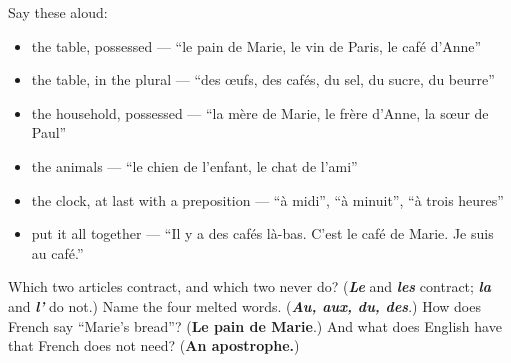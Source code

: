 Say these aloud:

\begin{itemize}
\raggedright
  \item the table, possessed — \textquotedblleft{}le pain de Marie, le vin de Paris, le café d'Anne\textquotedblright{}
  \item the table, in the plural — \textquotedblleft{}des œufs, des cafés, du sel, du sucre, du beurre\textquotedblright{}
  \item the household, possessed — \textquotedblleft{}la mère de Marie, le frère d'Anne, la sœur de Paul\textquotedblright{}
  \item the animals — \textquotedblleft{}le chien de l'enfant, le chat de l'ami\textquotedblright{}
  \item the clock, at last with a preposition — \textquotedblleft{}à midi\textquotedblright{}, \textquotedblleft{}à minuit\textquotedblright{}, \textquotedblleft{}à trois heures\textquotedblright{}
  \item put it all together — \textquotedblleft{}Il y a des cafés là-bas. C'est le café de Marie. Je suis au café.\textquotedblright{}
\end{itemize}

\begin{tcolorbox}[breakable,colback=teal!4,colframe=teal!35!black,title={Before you move on}]
Which two articles contract, and which two never do? (\emph{\textbf{Le}} and \emph{\textbf{les}} contract; \emph{\textbf{la}} and \emph{\textbf{l'}} do not.) Name the four melted words. (\emph{\textbf{Au, aux, du, des}}.) How does French say \textquotedblleft{}Marie's bread\textquotedblright{}? (\textbf{Le pain de Marie}.) And what does English have that French does not need? (\textbf{An apostrophe.})
\end{tcolorbox}
